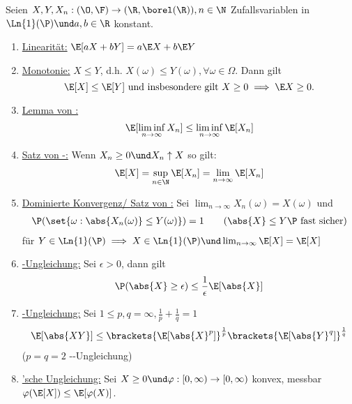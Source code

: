 \begin{proposition}
	Seien $X,Y,X_n: (\O,\F) \to (\R, \borel(\R)), n \in \N$ Zufallsvariablen in $\Ln{1}(\P)\und a,b \in \R$ konstant.
	\begin{enumerate}
		\item \ul{Linearität:} $\E[aX +bY] = a\E X + b\E Y$
		\item \ul{Monotonie:} $X \le Y$, d.h. $X(\omega) \le Y(\omega), \forall \omega \in \Omega$. Dann gilt 
		\[
			\E[X] \le \E[Y] \text{ und insbesondere gilt } X \ge 0 \implies \E X \ge 0.
		\]
		\item \ul{Lemma von :}
		\begin{align*}
			\E[\liminf_{n \to \infty}X_n] \le \liminf_{n \to \infty} \E[X_n]
		\end{align*}
		\item \ul{Satz von -:} Wenn $X_n \ge 0 \und X_n \uparrow X$ so gilt:
		\begin{align*}
			\E[X] = \sup_{n \in \N} \E[X_n] = \lim_{n \to \infty} \E[X_n]
		\end{align*}
		\item \ul{Dominierte Konvergenz/ Satz von :} Sei $\lim_{n \to \infty} X_n(\omega) = X(\omega)$ und
		\begin{align*}
		\P(\set{\omega: \abs{X_n(\omega)} \le Y(\omega)}) = 1 \qquad (\abs{X} \le Y \P \text{ fast sicher})
		\end{align*}
		für $Y \in \Ln{1}(\P) \implies X \in \Ln{1}(\P) \und \lim_{n \to \infty} \E[X] = \E[X]$
		\item \ul{-Ungleichung:} Sei $\epsilon > 0$, dann gilt
		\begin{align*}
		\P(\abs{X} \ge \epsilon) \le \frac{1}{\epsilon} \E[\abs{X}]
		\end{align*}
		\item \ul{-Ungleichung:} Sei $1 \le p,q = \infty, \frac{1}{p}+ \frac{1}{q} = 1$
		\begin{align*}
		\E[\abs{XY}] \le \brackets{\E[\abs{X}^p]}^{\frac{1}{p}} \brackets{\E[\abs{Y}^q]}^{\frac{1}{q}}
		\end{align*}
		($p =q =2$ --Ungleichung)
		\item \ul{'sche Ungleichung:} Sei $X \ge 0 \und \varphi: [0,\infty) \to [0,\infty)$ konvex, messbar \\
		$\varphi(\E[X]) \le \E[\varphi(X)]$.
	\end{enumerate}
\end{proposition}
